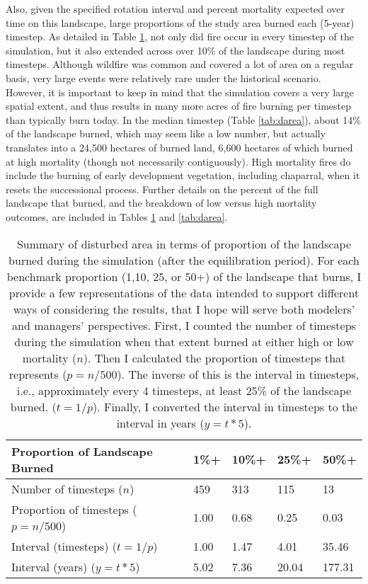 Also, given the specified rotation interval and percent mortality expected over time on this landscape, large proportions of the study area burned each (5-year) timestep. As detailed in Table \ref{tab:darea_atleast}, not only did fire occur in every timestep of the simulation, but it also extended across over 10\% of the landscape during most timesteps. Although wildfire was common and covered a lot of area on a regular basis, very large events were relatively rare under the historical scenario. However, it is important to keep in mind that the simulation covers a very large spatial extent, and thus results in many more acres of fire burning per timestep than typically burn today. In the median timestep (Table \ref{tab:darea}), about 14\% of the landscape burned, which may seem like a low number, but actually translates into a 24,500 hectares of burned land, 6,600 hectares of which burned at high mortality (though not necessarily contiguously). High mortality fires do include the burning of early development vegetation, including chaparral, when it resets the successional process. Further details on the percent of the full landscape that burned, and the breakdown of low versus high mortality outcomes, are included in Tables \ref{tab:darea_atleast} and \ref{tab:darea}.

\begin{table}[!htbp]
\footnotesize
\centering
\caption{Summary of disturbed area in terms of proportion of the landscape burned during the simulation (after the equilibration period). For each benchmark proportion (1,10, 25, or 50+) of the landscape that burns, I provide a few representations of the data intended to support different ways of considering the results, that I hope will serve both modelers' and managers' perspectives. First, I counted the number of timesteps during the simulation when that extent burned at either high or low mortality ($n$). Then I calculated the proportion of timesteps that represents ($p = n/500$). The inverse of this is the interval in timesteps, i.e., approximately every 4 timesteps, at least 25\% of the landscape burned. ($t = 1/p$). Finally, I converted the interval in timesteps to the interval in years ($y = t * 5$).}
\label{tab:darea_atleast}
\begin{tabular}{@{}lllll@{}}
\toprule
\textbf{Proportion of Landscape Burned} & \textbf{1\%+}     & \textbf{10\%+}    & \textbf{25\%+}    & \textbf{50\%+} \\ \midrule
Number of timesteps ($n$)        & 459              & 313              & 115              & 13            \\
Proportion of timesteps ($p = n/500$)    & 1.00             & 0.68             & 0.25             & 0.03          \\
Interval (timesteps) ($t = 1/p$)      & 1.00             & 1.47             & 4.01             & 35.46         \\
Interval (years)    ($y = t * 5$)       & 5.02             & 7.36             & 20.04            & 177.31        \\ \bottomrule
\end{tabular}
\end{table}

